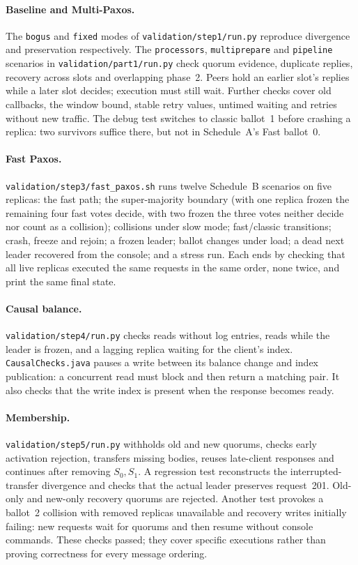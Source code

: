 \documentclass[times,10pt,twocolumn]{article}
\newcommand{\code}[1]{\texttt{\small #1}}
\begin{document}
\paragraph{Baseline and Multi-Paxos.}
The \code{bogus} and \code{fixed} modes of \code{validation/step1/run.py}
reproduce divergence and preservation respectively. The \code{processors},
\code{multiprepare} and \code{pipeline} scenarios in
\code{validation/part1/run.py} check quorum evidence, duplicate replies,
recovery across slots and overlapping phase~2. Peers hold an earlier slot's
replies while a later slot decides; execution must still wait. Further checks
cover old callbacks, the window bound, stable retry values, untimed waiting
and retries without new traffic. The debug test switches to classic ballot~1
before crashing a replica: two survivors suffice there, but not in
Schedule~A's Fast ballot~0.

\paragraph{Fast Paxos.}
\code{validation/step3/fast\_paxos.sh} runs twelve Schedule~B scenarios
on five replicas: the fast path; the super-majority boundary (with one
replica frozen the remaining four fast votes decide, with two frozen the
three votes neither decide nor count as a collision); collisions under
slow mode; fast/classic transitions; crash, freeze and rejoin; a frozen
leader; ballot changes under load; a dead next leader recovered from the
console; and a stress run. Each ends by checking that all live replicas
executed the same requests in the same order, none twice, and print the
same final state.

\paragraph{Causal balance.}
\code{validation/step4/run.py} checks reads without log entries, reads while
the leader is frozen, and a lagging replica waiting for the client's index.
\code{CausalChecks.java} pauses a write between its balance change and index
publication: a concurrent read must block and then return a matching pair.
It also checks that the write index is present when the response becomes ready.

\paragraph{Membership.}
\code{validation/step5/run.py} withholds old and new quorums, checks early
activation rejection, transfers missing bodies, reuses late-client responses
and continues after removing $S_0,S_1$. A regression test reconstructs the
interrupted-transfer divergence and checks that the actual leader preserves
request~201. Old-only and new-only recovery quorums are rejected. Another test
provokes a ballot~2 collision with removed replicas unavailable and recovery
writes initially failing: new requests wait for quorums and then resume
without console commands. These checks passed; they cover specific executions
rather than proving correctness for every message ordering.
\end{document}
